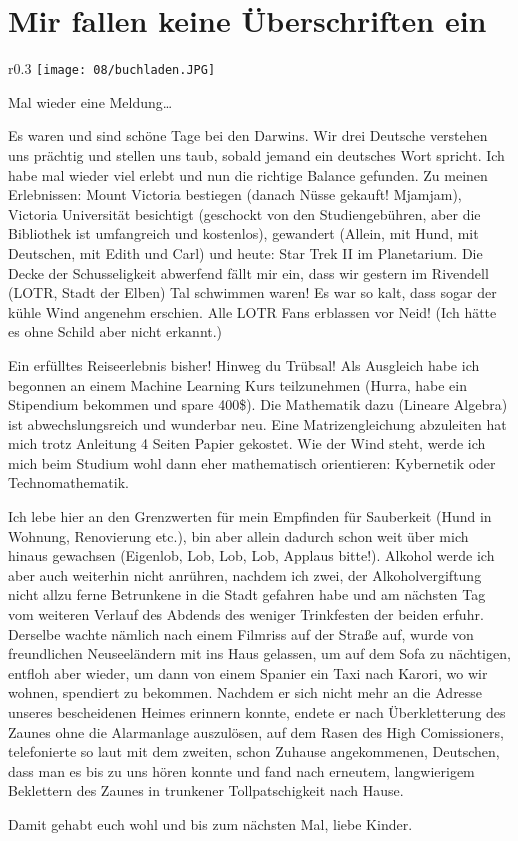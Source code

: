 \chapter{Mir fallen keine \"Uberschriften ein}

\begin{wrapfigure}[16]{r}{0.3\textwidth}
  \centering
  \texttt{[image: 08/buchladen.JPG]}
\end{wrapfigure}
Mal wieder eine Meldung\ldots{}

Es waren und sind schöne Tage bei den Darwins. Wir drei Deutsche
verstehen uns prächtig und stellen uns taub, sobald jemand ein
deutsches Wort spricht. Ich habe mal wieder viel erlebt und nun die
richtige Balance gefunden. Zu meinen Erlebnissen: Mount Victoria
bestiegen (danach Nüsse gekauft! Mjamjam), Victoria Universität
besichtigt (geschockt von den Studiengebühren, aber die Bibliothek ist
umfangreich und kostenlos), gewandert (Allein, mit Hund, mit
Deutschen, mit Edith und Carl) und heute: Star Trek II im
Planetarium. Die Decke der Schusseligkeit abwerfend fällt mir ein,
dass wir gestern im Rivendell (LOTR, Stadt der Elben) Tal schwimmen
waren! Es war so kalt, dass sogar der kühle Wind angenehm
erschien. Alle LOTR Fans erblassen vor Neid!  (Ich hätte es ohne
Schild aber nicht erkannt.)

Ein erfülltes Reiseerlebnis bisher! Hinweg du Trübsal! Als Ausgleich
habe ich begonnen an einem Machine Learning Kurs teilzunehmen (Hurra,
habe ein Stipendium bekommen und spare 400\$). Die Mathematik dazu
(Lineare Algebra) ist abwechslungsreich und wunderbar neu. Eine
Matrizengleichung abzuleiten hat mich trotz Anleitung 4 Seiten Papier
gekostet. Wie der Wind steht, werde ich mich beim Studium wohl dann eher
mathematisch orientieren: Kybernetik oder Technomathematik.

Ich lebe hier an den Grenzwerten für mein Empfinden für Sauberkeit (Hund
in Wohnung, Renovierung etc.), bin aber allein dadurch schon weit über
mich hinaus gewachsen (Eigenlob, Lob, Lob, Lob, Applaus bitte!). Alkohol
werde ich aber auch weiterhin nicht anrühren, nachdem ich zwei, der
Alkoholvergiftung nicht allzu ferne Betrunkene in die Stadt gefahren
habe und am nächsten Tag vom weiteren Verlauf des Abdends des weniger
Trinkfesten der beiden erfuhr. Derselbe wachte nämlich nach einem
Filmriss auf der Straße auf, wurde von freundlichen Neuseeländern mit
ins Haus gelassen, um auf dem Sofa zu nächtigen, entfloh aber wieder, um
dann von einem Spanier ein Taxi nach Karori, wo wir wohnen, spendiert zu
bekommen. Nachdem er sich nicht mehr an die Adresse unseres bescheidenen
Heimes erinnern konnte, endete er nach Überkletterung des Zaunes ohne
die Alarmanlage auszulösen, auf dem Rasen des High Comissioners,
telefonierte so laut mit dem zweiten, schon Zuhause angekommenen,
Deutschen, dass man es bis zu uns hören konnte und fand nach erneutem,
langwierigem Beklettern des Zaunes in trunkener Tollpatschigkeit nach
Hause.

Damit gehabt euch wohl und bis zum nächsten Mal, liebe Kinder.
